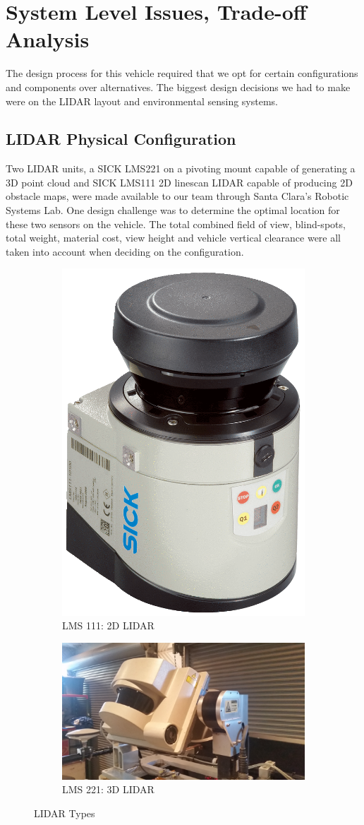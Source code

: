 \section{System Level Issues, Trade-off Analysis}
The design process for this vehicle required that we opt for certain configurations and components over alternatives. The biggest design decisions we had to make were on the LIDAR layout and environmental sensing systems.\\

\subsection{LIDAR Physical Configuration}

Two LIDAR units, a SICK LMS221 on a pivoting mount capable of generating a 3D point cloud and SICK LMS111 2D linescan LIDAR capable of producing 2D obstacle maps, were made available to our team through Santa Clara's  Robotic Systems Lab. One design challenge was to determine the optimal location for these two sensors on the vehicle. The total combined field of view, blind-spots, total weight, material cost, view height and vehicle vertical clearance were all taken into account when deciding on the configuration. 

\begin{figure}[H]
\centering
\begin{subfigure}{.5\textwidth}
  \centering
  \includegraphics[height=.5\linewidth]{LMS111}
  \caption{LMS 111: 2D LIDAR}
\end{subfigure}%
\begin{subfigure}{.5\textwidth}
  \centering
  \includegraphics[height=.5\linewidth]{LMS221}
  \caption{LMS 221: 3D LIDAR}
\end{subfigure}
\caption{LIDAR Types}
\label{fig:lidartest}
\end{figure}

